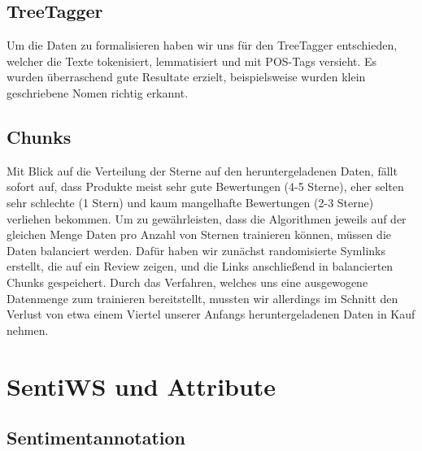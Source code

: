 \documentclass[a4paper]{article}
\begin{document}


\subsection{TreeTagger}

Um die Daten zu formalisieren haben wir uns für den TreeTagger entschieden, welcher die Texte tokenisiert, lemmatisiert und mit POS-Tags versieht. Es wurden überraschend gute Resultate erzielt, beispielsweise wurden klein geschriebene Nomen richtig erkannt.




\subsection{Chunks}

Mit Blick auf die Verteilung der Sterne auf den heruntergeladenen Daten, fällt sofort auf, dass Produkte meist sehr gute Bewertungen (4-5 Sterne), eher selten sehr schlechte (1 Stern) und kaum mangelhafte Bewertungen (2-3 Sterne) verliehen bekommen.\newline
Um zu gewährleisten, dass die Algorithmen jeweils auf der gleichen Menge Daten pro Anzahl von Sternen trainieren können, müssen die Daten balanciert werden. 
Dafür haben wir zunächst randomisierte Symlinks erstellt, die auf ein Review zeigen, und die Links anschließend in balancierten Chunks gespeichert. 
Durch das Verfahren, welches uns eine ausgewogene Datenmenge zum trainieren bereitstellt, mussten wir allerdings im Schnitt den Verlust von etwa einem Viertel unserer Anfangs heruntergeladenen Daten in Kauf nehmen.


\section{SentiWS und Attribute}


\subsection{Sentimentannotation}
\end{document}
